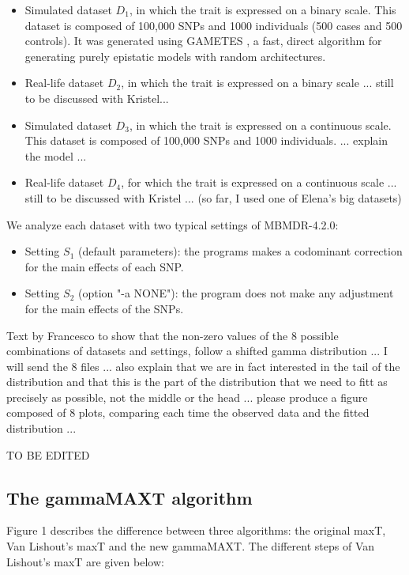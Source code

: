 \documentclass{bmcart}
\begin{document}
\begin{itemize}
\item Simulated dataset $D_1$, in which the trait is expressed on a binary scale. This dataset is composed of 100,000 SNPs and 1000 individuals (500 cases and 500 controls). It was generated using GAMETES  \cite{gametes2012}, a fast, direct algorithm for generating purely epistatic models with random architectures.
\item Real-life dataset $D_2$, in which the trait is expressed on a binary scale ... still to be discussed with Kristel...
\item Simulated dataset $D_3$, in which the trait is expressed on a continuous scale. This dataset is composed of 100,000 SNPs and 1000 individuals. ... explain the model ...

\item Real-life dataset $D_4$, for which the trait is expressed on a continuous scale ... still to be discussed with Kristel ... (so far, I used one of Elena's big datasets)
\end{itemize}

We analyze each dataset with two typical settings of MBMDR-4.2.0:
\begin{itemize}
\item Setting $S_1$ (default parameters): the programs makes a codominant correction for the main effects of each SNP.
\item Setting $S_2$ (option "-a NONE"): the program does not make any adjustment for the main effects of the SNPs.
\end{itemize}

\smallskip

{\color{red} Text by Francesco to show that the non-zero values of the 8 possible combinations of datasets and settings, follow a shifted gamma distribution ... I will send the 8 files ... also explain that we are in fact interested in the tail of the distribution and that this is the part of the distribution that we need to fitt as precisely as possible, not the middle or the head ... please produce a figure composed of 8 plots, comparing each time the observed data and the fitted distribution ...}

{\color{purple} TO BE EDITED}

\subsection*{The gammaMAXT algorithm}

Figure 1 describes the difference between three algorithms: the original maxT, Van Lishout's maxT and the new gammaMAXT. The different steps of Van Lishout's maxT are given below: 
\end{document}
